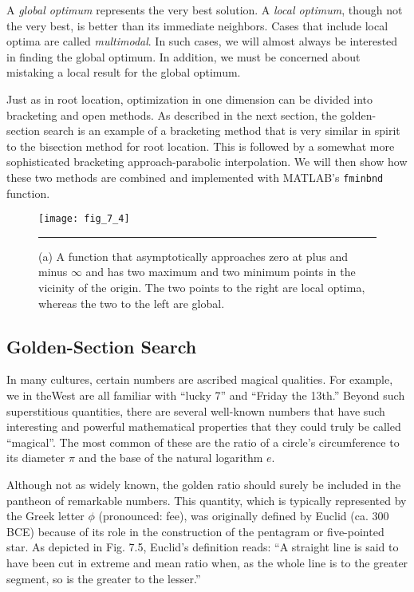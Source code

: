 \documentclass[../main.tex]{subfiles}
\begin{document}
A \textit{global optimum} represents the very best solution. A \textit{local optimum}, though not the
very best, is better than its immediate neighbors. Cases that include local optima are called
\textit{multimodal}. In such cases, we will almost always be interested in finding the global optimum.
In addition, we must be concerned about mistaking a local result for the global optimum.

Just as in root location, optimization in one dimension can be divided into bracketing
and open methods. As described in the next section, the golden-section search is an example
of a bracketing method that is very similar in spirit to the bisection method for root location.
This is followed by a somewhat more sophisticated bracketing approach-parabolic interpolation.
We will then show how these two methods are combined and implemented with
MATLAB's \texttt{fminbnd} function.

\begin{figure}[H]
	\centering
	\texttt{[image: fig\_7\_4]}
	\caption{\textsf{(a) A function that asymptotically approaches zero at plus and minus $\infty$ and has two maximum and
	two minimum points in the vicinity of the origin. The two points to the right are local optima,
	whereas the two to the left are global.}}
	\color{cyan} \rule{\linewidth}{0,5mm}
	\label{fig:fig_7_4}
\end{figure}

\subsection{Golden-Section Search}

In many cultures, certain numbers are ascribed magical qualities. For example, we in theWest
are all familiar with ``lucky 7'' and ``Friday the 13th.'' Beyond such superstitious quantities,
there are several well-known numbers that have such interesting and powerful mathematical
properties that they could truly be called ``magical''. The most common of these are the ratio
of a circle's circumference to its diameter $\pi$ and the base of the natural logarithm $e$.

Although not as widely known, the golden ratio should surely be included in the pantheon
of remarkable numbers. This quantity, which is typically represented by the Greek
letter $\phi$ (pronounced: fee), was originally defined by Euclid (ca. 300 BCE) because of its
role in the construction of the pentagram or five-pointed star. As depicted in Fig. 7.5,
Euclid's definition reads: ``A straight line is said to have been cut in extreme and mean ratio
when, as the whole line is to the greater segment, so is the greater to the lesser.''
\end{document}
